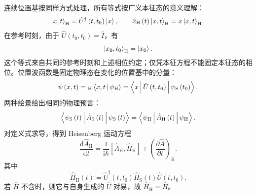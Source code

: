 连续位置基按同样方式处理，所有等式按广义本征态的意义理解：
\begin{equation}
\Ket{x,t}_{\mathrm{H}}=\hat U^\dag\left(t,t_0\right)\Ket{x},
\qquad
\hat x_{\mathrm{H}}\left(t\right)\Ket{x,t}_{\mathrm{H}}
=x\Ket{x,t}_{\mathrm{H}}.
\end{equation}
在参考时刻，由于 $\hat U\left(t_0,t_0\right)=\hat I$，有
\begin{equation}
\Ket{x_0,t_0}_{\mathrm{H}}=\Ket{x_0}.
\end{equation}
这个等式来自共同的参考时刻和上述相位约定；仅凭本征方程不能固定本征态的相位。位置波函数是固定物理态在变化的位置基中的分量：
\begin{equation}
\psi\left(x,t\right)
={}_{\mathrm{H}}\Braket{x,t|\psi_{\mathrm{H}}}
=\Braket{x|\hat U\left(t,t_0\right)|\psi_{\mathrm{S}}\left(t_0\right)}.
\end{equation}
两种绘景给出相同的物理预言：
\begin{equation}
\Braket{\psi_{\mathrm{S}}\left(t\right)|\hat A_{\mathrm{S}}\left(t\right)|
\psi_{\mathrm{S}}\left(t\right)}
=\Braket{\psi_{\mathrm{H}}|\hat A_{\mathrm{H}}\left(t\right)|\psi_{\mathrm{H}}}.
\end{equation}
对定义式求导，得到 Heisenberg 运动方程
\begin{equation}
\boxed{\frac{\mathrm{d}\hat A_{\mathrm{H}}}{\mathrm{d}t}
=\frac{1}{\mathrm{i}\hbar}\left[\hat A_{\mathrm{H}},\hat H_{\mathrm{H}}\right]
+\left(\frac{\partial\hat A}{\partial t}\right)_{\mathrm{H}}.}
\label{eq:heisenberg-equation}
\end{equation}
其中
\begin{equation}
\hat H_{\mathrm{H}}\left(t\right)=\hat U^\dagger\left(t,t_0\right)
\hat H_{\mathrm{S}}\left(t\right)\hat U\left(t,t_0\right).
\end{equation}
若 $\hat H$ 不含时，则它与自身生成的 $\hat U$ 对易，故 $\hat H_{\mathrm{H}}=\hat H$。

